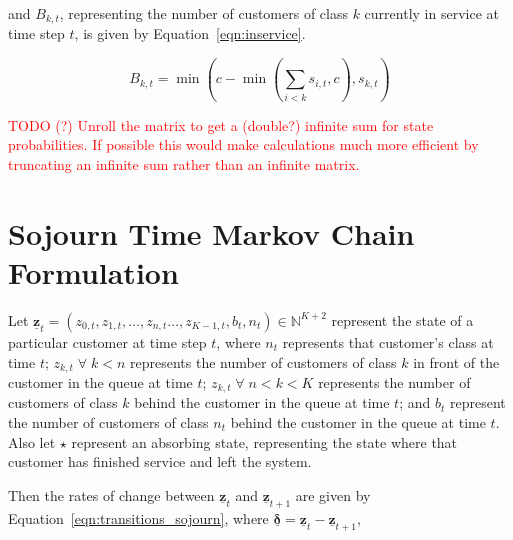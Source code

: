 \documentclass{article}
\begin{document}
and $B_{k,t}$, representing the number of customers of class $k$ currently in
service at time step $t$, is given by Equation~\ref{eqn:inservice}.

\begin{equation}\label{eqn:inservice}
B_{k,t} =\min\left(c - \min\left(\sum_{i < k} s_{i,t}, c\right), s_{k,t}\right)
\end{equation}

\textcolor{red}{TODO (?) Unroll the matrix to get a (double?) infinite sum for state probabilities. If possible this would make calculations much more efficient by truncating an infinite sum rather than an infinite matrix.}


\section{Sojourn Time Markov Chain Formulation}
Let $\underline{\mathbf{z}}_t = (z_{0,t}, z_{1,t}, \dots, z_{n,t} \dots, z_{K-1,t}, b_t, n_t) \in \mathbb{N}^{K+2}$
represent the state of a particular customer at time step $t$, where $n_t$
represents that customer's class at time $t$; $z_{k,t} \; \forall \; k < n$
represents the number of customers of class $k$ in front of the customer in the
queue at time $t$; $z_{k,t} \; \forall \; n < k < K$ represents the number of
customers of class $k$ behind the customer in the queue at time $t$; and $b_t$
represent the number of customers of class $n_t$ behind the customer in the
queue at time $t$.
Also let $\star$ represent an absorbing state, representing the state where that
customer has finished service and left the system.

Then the rates of change between $\underline{\mathbf{z}}_t$ and
$\underline{\mathbf{z}}_{t+1}$ are given by Equation~\ref{eqn:transitions_sojourn},
where $\underline{\mathbf{\delta}} = \underline{\mathbf{z}}_t - \underline{\mathbf{z}}_{t+1}$,
\end{document}
